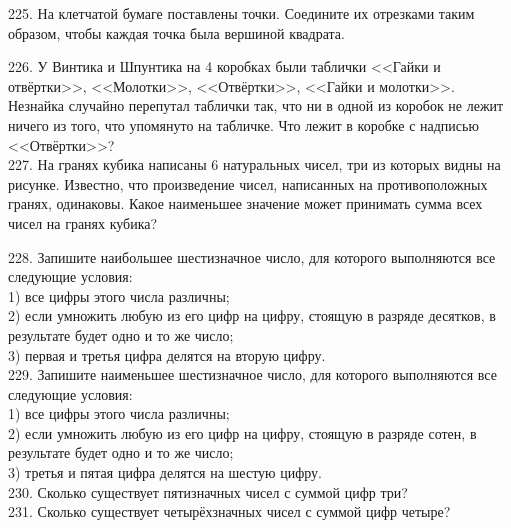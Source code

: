 \begin{center}
\begin{figure}[ht!]
\end{figure}
\end{center}
225. На клетчатой бумаге поставлены точки. Соедините их отрезками таким образом, чтобы каждая точка была вершиной квадрата.
\begin{center}
\begin{figure}[ht!]
\end{figure}
\end{center}
226. У Винтика и Шпунтика на 4 коробках были таблички <<Гайки и отвёртки>>, <<Молотки>>, <<Отвёртки>>, <<Гайки и молотки>>. Незнайка случайно перепутал таблички так, что ни в одной из коробок не лежит ничего из того, что упомянуто на табличке. Что лежит в коробке с надписью <<Отвёртки>>?\\
227. На гранях кубика написаны 6 натуральных чисел, три из которых видны на рисунке. Известно, что произведение чисел, написанных на противоположных гранях, одинаковы. Какое наименьшее значение может принимать сумма всех чисел на гранях кубика?
\begin{center}
\begin{figure}[ht!]
\end{figure}
\end{center}
228. Запишите наибольшее шестизначное число, для которого выполняются все следующие условия:\\
1) все цифры этого числа различны;\\
2) если умножить любую из его цифр на цифру, стоящую в разряде десятков, в результате будет одно и то же число;\\
3) первая и третья цифра делятся на вторую цифру.\\
229. Запишите наименьшее шестизначное число, для которого выполняются все следующие условия:\\
1) все цифры этого числа различны;\\
2) если умножить любую из его цифр на цифру, стоящую в разряде сотен, в результате будет одно и то же число;\\
3) третья и пятая цифра делятся на шестую цифру.\\
230. Сколько существует пятизначных чисел с суммой цифр три?\\
231. Сколько существует четырёхзначных чисел с суммой цифр четыре?\\
